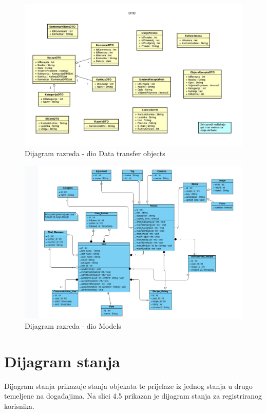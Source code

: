 		\eject

		\begin{figure}[H]
			\includegraphics[scale=0.32]{dijagrami/razdijag_dto.jpeg}
			\centering
			\caption{Dijagram razreda - dio Data transfer objects}
			\label{fig:bpdiag}
		\end{figure}

		\eject

		\begin{figure}[H]
			\includegraphics[scale=0.4]{dijagrami/razdijag_model.png}
			\centering
			\caption{Dijagram razreda - dio Models}
			\label{fig:bpdiag}
		\end{figure}

		\eject

		\section{Dijagram stanja}
		Dijagram stanja prikazuje stanja objekata te prijelaze iz jednog stanja u drugo
		temeljene na događajima. Na slici 4.5 prikazan je dijagram stanja za registriranog
		korisnika.

